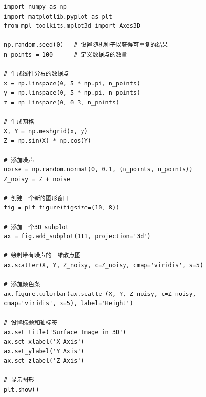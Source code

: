 \documentclass[zihao=-4]{ctexart}
\begin{document}
\clearpage
{}
\begin{lstlisting}
import numpy as np
import matplotlib.pyplot as plt
from mpl_toolkits.mplot3d import Axes3D

np.random.seed(0)	# 设置随机种子以获得可重复的结果
n_points = 100		# 定义数据点的数量

# 生成线性分布的数据点
x = np.linspace(0, 5 * np.pi, n_points)
y = np.linspace(0, 5 * np.pi, n_points)
z = np.linspace(0, 0.3, n_points)

# 生成网格
X, Y = np.meshgrid(x, y)
Z = np.sin(X) * np.cos(Y)

# 添加噪声
noise = np.random.normal(0, 0.1, (n_points, n_points))
Z_noisy = Z + noise

# 创建一个新的图形窗口
fig = plt.figure(figsize=(10, 8))

# 添加一个3D subplot
ax = fig.add_subplot(111, projection='3d')

# 绘制带有噪声的三维散点图
ax.scatter(X, Y, Z_noisy, c=Z_noisy, cmap='viridis', s=5)

# 添加颜色条
ax.figure.colorbar(ax.scatter(X, Y, Z_noisy, c=Z_noisy, cmap='viridis', s=5), label='Height')

# 设置标题和轴标签
ax.set_title('Surface Image in 3D')
ax.set_xlabel('X Axis')
ax.set_ylabel('Y Axis')
ax.set_zlabel('Z Axis')

# 显示图形
plt.show()
\end{lstlisting}
\end{document}
